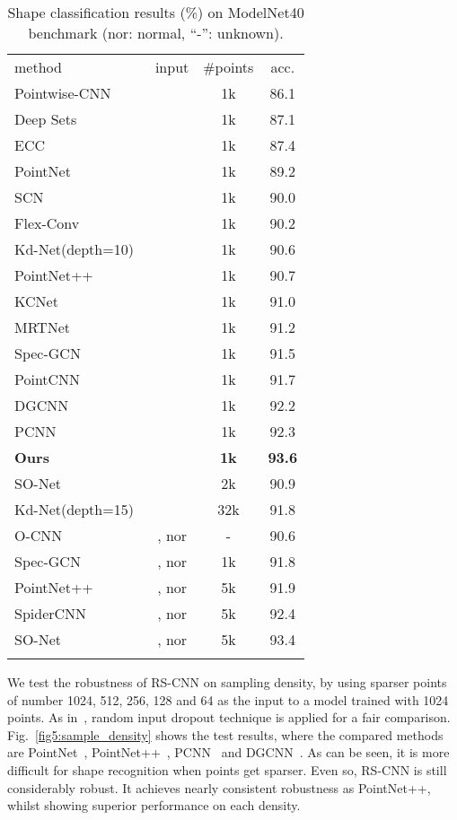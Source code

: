\documentclass[10pt,twocolumn,letterpaper]{article}
\begin{document}
\begin{table}[t]
  \centering
\small
  \caption{Shape classification results (\%) on ModelNet40 benchmark (nor: normal, ``-'': unknown).}
\begin{tabular}{l|ccc}
  \Xhline{0.8pt}
  method & input & \#points & acc. \\
\Xhline{0.5pt}
  Pointwise-CNN~\cite{c17_pointwise} &  & 1k & 86.1 \\
  Deep Sets~\cite{c24} &  & 1k & 87.1 \\
  ECC~\cite{c32} &  & 1k & 87.4 \\
  PointNet~\cite{c1_pointnet} &  & 1k & 89.2 \\
  SCN~\cite{c7_attsp} &  & 1k & 90.0 \\
  Flex-Conv~\cite{flex_conv} &  & 1k & 90.2 \\
  Kd-Net(depth=10)~\cite{c26} &  & 1k & 90.6 \\
  PointNet++~\cite{c2_pointnet2} &  & 1k & 90.7 \\
  KCNet~\cite{c9_kcnet} &  & 1k & 91.0 \\
  MRTNet~\cite{c45} &  & 1k & 91.2 \\
  Spec-GCN~\cite{c14_scn} &  & 1k & 91.5 \\
  PointCNN~\cite{c27} &  & 1k & 91.7 \\
  DGCNN~\cite{c22} &  & 1k & 92.2 \\
  PCNN~\cite{c16_eocnn} &  & 1k & 92.3 \\
  \textbf{Ours} &  & \textbf{1k} & \textbf{93.6} \\
  SO-Net~\cite{c20} &  & 2k & 90.9 \\
  Kd-Net(depth=15)~\cite{c26} &  & 32k & 91.8 \\
  \Xhline{0.5pt}
  O-CNN~\cite{c29} & , nor & - & 90.6 \\
  Spec-GCN~\cite{c14_scn} & , nor & 1k & 91.8 \\
  PointNet++~\cite{c2_pointnet2} & , nor & 5k & 91.9 \\
  SpiderCNN~\cite{c21} & , nor & 5k & 92.4 \\
  SO-Net~\cite{c20} & , nor & 5k & 93.4 \\
  \Xhline{0.8pt}
  \end{tabular}
  \label{Tab1:cls}
\end{table}

We test the robustness of RS-CNN on sampling density, by using sparser points of number 1024, 512, 256, 128 and 64 as the input to a model trained with 1024 points. As in~\cite{c2_pointnet2}, random input dropout technique is applied for a fair comparison. Fig.~\ref{fig5:sample_density} shows the test results, where the compared methods are PointNet~\cite{c1_pointnet}, PointNet++~\cite{c2_pointnet2}, PCNN~\cite{c16_eocnn} and DGCNN~\cite{c22}. As can be seen, it is more difficult for shape recognition when points get sparser. Even so, RS-CNN is still considerably robust. It achieves nearly consistent robustness as PointNet++, whilst showing superior performance on each density.
\end{document}
